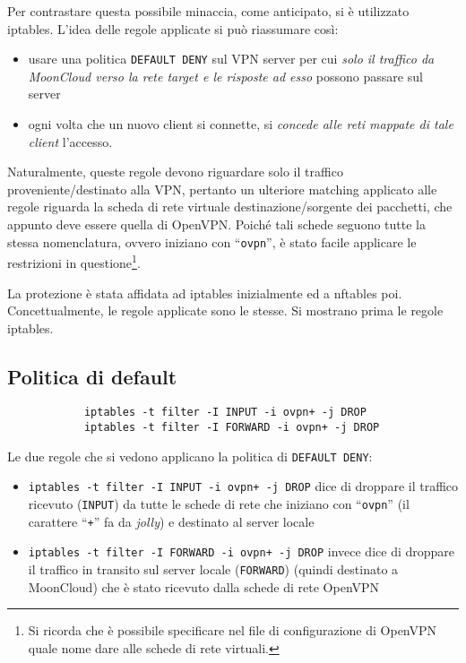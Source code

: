  
Per contrastare questa possibile minaccia, come anticipato, si è utilizzato iptables.
L'idea delle regole applicate si può riassumare così:
\begin{itemize}
	\item usare una politica \texttt{DEFAULT DENY} sul VPN server per cui \textit{solo
		il traffico da MoonCloud verso la rete target e le risposte ad esso} possono passare sul server
		\item ogni volta che un nuovo client si connette, si \textit{concede alle reti
			mappate di tale client} l'accesso.
		\end{itemize}
				
		Naturalmente, queste regole devono riguardare solo il traffico proveniente/destinato
		alla VPN, pertanto un ulteriore matching applicato alle regole riguarda la scheda di
		rete virtuale destinazione/sorgente dei pacchetti, che appunto deve essere quella
		di OpenVPN. Poiché tali schede seguono tutte la stessa nomenclatura, ovvero iniziano con
		``\texttt{ovpn}'', è stato facile applicare le restrizioni in questione\footnote{Si ricorda che
			è possibile specificare nel file di configurazione di OpenVPN quale nome dare alle schede di rete
		virtuali.}.
		
		La protezione è stata affidata ad iptables inizialmente ed a nftables poi. Concettualmente,
		le regole applicate sono le stesse. Si mostrano prima le regole iptables.
				
		\subsection{Politica di default}
				
		\begin{verbatim}
			iptables -t filter -I INPUT -i ovpn+ -j DROP
			iptables -t filter -I FORWARD -i ovpn+ -j DROP
		\end{verbatim}
				
		Le due regole che si vedono applicano la politica di \texttt{DEFAULT DENY}:
		\begin{itemize}
			\item \texttt{iptables -t filter -I INPUT -i ovpn+ -j DROP} dice di droppare
			      il traffico ricevuto (\texttt{INPUT})
			      da tutte le schede di rete che iniziano con ``\texttt{ovpn}''
			      (il carattere ``\texttt{+}'' fa da \textit{jolly}) e destinato al server locale
			\item \texttt{iptables -t filter -I FORWARD -i ovpn+ -j DROP} invece dice
			      di droppare il traffico in transito sul server locale (\texttt{FORWARD}) (quindi
			      destinato a MoonCloud)
			      che è stato ricevuto dalla schede di rete OpenVPN
		\end{itemize}
				
